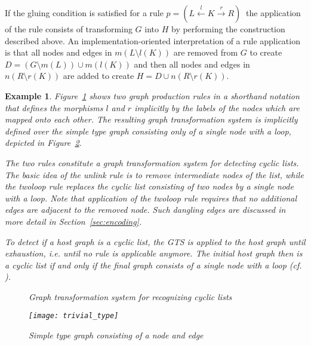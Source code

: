 \documentclass{tlp}
\newtheorem{example}{Example}[section]
\newcommand{\prodrule}{\ensuremath{p = (L \stackrel{l}{\leftarrow} K
\stackrel{r}{\rightarrow} R)\ }}
\begin{document}
If the gluing condition is satisfied for a rule $\prodrule$ the application of
the rule consists of transforming $G$ into $H$ by performing the construction
described above. An implementation-oriented interpretation of a rule application
is that all nodes and edges in $m(L \setminus l(K))$ are removed from $G$ to
create $D = (G \setminus m(L)) \cup m(l(K))$ and then all nodes and edges in $n(R
\setminus r(K))$ are added to create $H = D \cup n(R \setminus r(K))$.

\begin{example}\label{ex:gts}
Figure~\ref{fig:cyclic_grs} shows two graph production rules in a shorthand
notation that defines the morphisms $l$ and $r$ implicitly by the labels of the
nodes which are mapped onto each other. The resulting graph transformation system
is implicitly defined over the simple type graph consisting only of a single node
with a loop, depicted in Figure~\ref{fig:trivial_type}.

The two rules constitute a graph transformation system for detecting cyclic
lists. The basic idea of the \emph{unlink} rule is to remove intermediate nodes
of the list, while the \emph{twoloop} rule replaces the cyclic list consisting of
two nodes by a single node with a loop. Note that application of the
\emph{twoloop} rule requires that no additional edges are adjacent to the removed
node. Such \emph{dangling edges} are discussed in more detail in
Section~\ref{sec:encoding}.

To detect if a host graph is a cyclic list, the GTS is applied to the host graph
until exhaustion, i.e. until no rule is applicable anymore. The initial host
graph then is a cyclic list if and only if the final graph consists of a single
node with a loop (cf. \cite{bakewellplumprunciman03}).

\begin{figure}
\centerline{
}
\caption{Graph transformation system for recognizing cyclic lists}
\label{fig:cyclic_grs}
\end{figure}

\begin{figure}
\texttt{[image: trivial\_type]} 
\caption{Simple type graph consisting of a node and edge}
\label{fig:trivial_type}
\end{figure}
\end{example}
\end{document}
